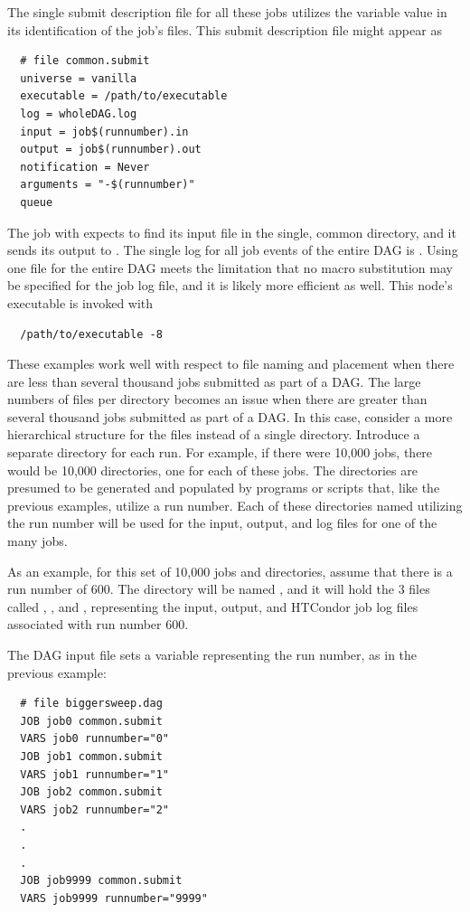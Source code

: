 \begin{description}
The single submit description file for all these jobs utilizes the
 variable value in its identification of the job's
files. 
This submit description file might appear as
\begin{verbatim}
  # file common.submit
  universe = vanilla
  executable = /path/to/executable
  log = wholeDAG.log
  input = job$(runnumber).in
  output = job$(runnumber).out
  notification = Never
  arguments = "-$(runnumber)"
  queue
\end{verbatim}
The job with  expects to find its input file  
in the single, common directory, and it 
sends its output to .
The single log for all job events of the entire DAG is .
Using one file for the entire DAG meets the limitation that no macro
substitution may be specified for the job log file, 
and it is likely more efficient as well. 
This node's executable is invoked with
\begin{verbatim}
  /path/to/executable -8
\end{verbatim}

\end{description}

These examples work well with respect to file naming and placement
when there are less than several thousand jobs submitted as part
of a DAG.
The large numbers of files per directory becomes an issue when there
are greater than several thousand jobs submitted as part of a DAG.
In this case,
consider a more hierarchical structure for the files instead of a single
directory.
Introduce a separate directory for each run.
For example, if there were 10,000 jobs, there would be
10,000 directories, one for each of these jobs.
The directories are presumed to be generated and populated by 
programs or scripts that,
like the previous examples, utilize a run number.
Each of these directories named utilizing the run number will be used
for the input, output, and log files for one of the many jobs.

As an example, for this set of 10,000 jobs and directories, assume
that there is a run number of 600.
The directory will be named , and it will
hold the 3 files called , , and ,
representing the input, output, and HTCondor job log files associated
with run number 600.

The DAG input file sets a variable representing the run number,
as in the previous example:
\begin{verbatim}
  # file biggersweep.dag
  JOB job0 common.submit
  VARS job0 runnumber="0"
  JOB job1 common.submit
  VARS job1 runnumber="1"
  JOB job2 common.submit
  VARS job2 runnumber="2"
  .
  .
  .
  JOB job9999 common.submit
  VARS job9999 runnumber="9999"
\end{verbatim}

